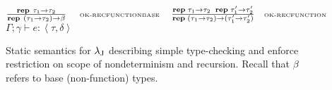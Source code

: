 \begin{figure}
\begin{spacing}{2.0}
{{\begin{center}
                    $\frac{
                        \textbf{rep}~\tau_1\rightarrow \tau_2
                    }{
                        \textbf{rep}~(\tau_1\rightarrow \tau_2) \rightarrow\beta
                    }~~~~\tiny{\textrm{OK-RECFUNCTIONBASE}}
                    ~~~~~
                    \frac{
                        \textbf{rep}~\tau_1 \rightarrow \tau_2~~\textbf{rep}~\tau'_1 \rightarrow \tau'_2
                    }{
                        \textbf{rep}~(\tau_1 \rightarrow \tau_2) \rightarrow (\tau'_1 \rightarrow \tau'_2)
                    }~~~~\tiny{\textrm{OK-RECFUNCTION}}$
                    \\
                    \scriptsize{
                        $ \boxed{\Gamma;\gamma\vdash e:\left\langle \tau, \delta \right\rangle }$}
                    \\
                \end{center}
               }
           }
\end{spacing}
\caption{Static semantics for ${\lambda_{\text{J}}}$ describing simple type-checking and enforce restriction on scope of nondeterminism and recursion. Recall that $\beta$ refers to base (non-function) types.}
\label{static-sem-lambdaj}
\end{figure}